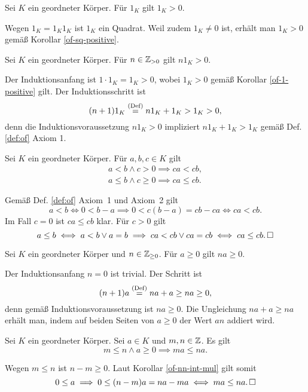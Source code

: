\begin{Korollar}\label{of-1-positive}
Sei $K$ ein geordneter Körper. Für $1_K$ gilt $1_K>0$.
\end{Korollar}

\begin{Beweis}
Wegen $1_K = 1_K 1_K$ ist $1_K$ ein Quadrat. Weil zudem $1_K\ne 0$ ist,
erhält man $1_K>0$ gemäß Korollar \ref{of-sq-positive}.\,\qedsymbol
\end{Beweis}

\begin{Korollar}
Sei $K$ ein geordneter Körper. Für $n\in\mathbb Z_{>0}$ gilt $n1_K>0$.
\end{Korollar}

\begin{Beweis}
Der Induktionsanfang ist $1\cdot 1_K = 1_K > 0$, wobei $1_K>0$ gemäß
Korollar \ref{of-1-positive} gilt. Der Induktionsschritt ist
\[(n+1)1_K \stackrel{\mathrm{(Def)}}{=} n1_K + 1_K > 1_K > 0,\]
denn die Induktionsvoraussetzung $n1_K>0$ impliziert
$n1_K+1_K>1_K$ gemäß Def. \ref{def:of} Axiom 1.\,\qedsymbol
\end{Beweis}

\begin{Korollar}\label{of-ineq-mul}
Sei $K$ ein geordneter Körper. Für $a,b,c\in K$ gilt
\begin{gather*}
a<b\land c>0\implies ca<cb,\\
a\le b\land c\ge 0\implies ca\le cb.
\end{gather*}
\end{Korollar}
\begin{Beweis}
Gemäß Def. \ref{def:of} Axiom~1 und Axiom~2 gilt
\[a<b\iff 0<b-a \implies 0<c(b-a) = cb-ca\iff ca<cb.\]
Im Fall $c=0$ ist $ca\le cb$ klar. Für $c>0$ gilt
\[a\le b\iff a<b\lor a=b\implies ca<cb\lor ca=cb\iff ca\le cb.\,\square\]
\end{Beweis}

\begin{Korollar}\label{of-nn-int-mul}
Sei $K$ ein geordneter Körper und $n\in\mathbb Z_{\ge 0}$. Für $a\ge 0$ gilt
$na\ge 0$.
\end{Korollar}
\begin{Beweis} Der Induktionsanfang $n=0$ ist trivial. Der Schritt ist
\[(n+1)a \stackrel{\mathrm{(Def)}}{=} na+a \ge na \ge 0,\]
denn gemäß Induktionsvoraussetzung ist $na\ge 0$. Die Ungleichung
$na+a\ge na$ erhält man, indem auf beiden Seiten von
$a\ge 0$ der Wert $an$ addiert wird.\,\qedsymbol
\end{Beweis}

\begin{Korollar}
Sei $K$ ein geordneter Körper. Sei $a\in K$ und $m,n\in\mathbb Z$.
Es gilt
\[m\le n\land a\ge 0\implies ma\le na.\]
\end{Korollar}
\begin{Beweis}
Wegen $m\le n$ ist $n-m\ge 0$. Laut Korollar \ref{of-nn-int-mul}
gilt somit
\[0\le a \implies 0\le (n-m)a = na-ma\iff ma\le na.\,\square\]
\end{Beweis}
